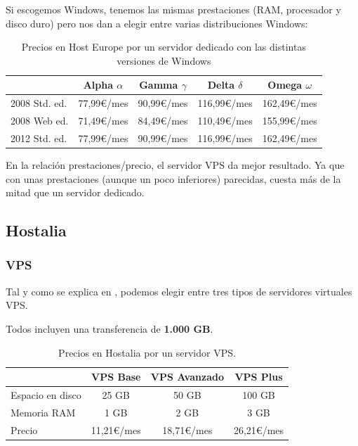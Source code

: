 \documentclass[10pt,a4paper,spanish]{article}
\numberwithin{equation}{section} %
\numberwithin{figure}{section} %
\numberwithin{table}{section} %
\begin{document}
Si escogemos Windows, tenemos las mismas prestaciones (RAM, procesador y disco duro) pero nos dan a elegir entre varias distribuciones Windows:

\begin{table}[!h]
\begin{tabular}{l | c | c | c | c}
 & Alpha $\alpha$ & Gamma $\gamma$ & Delta $\delta$ & Omega $\omega$ \\
\hline
2008 Std. ed. & 77,99\euro/mes & 90,99\euro/mes & 116,99\euro/mes & 162,49\euro/mes \\
2008 Web ed. & 71,49\euro/mes & 84,49\euro/mes & 110,49\euro/mes & 155,99\euro/mes \\
2012 Std. ed. & 77,99\euro/mes & 90,99\euro/mes & 116,99\euro/mes & 162,49\euro/mes \\
\end{tabular}
\caption{Precios en Host Europe por un servidor dedicado con las distintas versiones de Windows}
\label{hesewin}
\end{table}

En la relación prestaciones/precio, el servidor VPS da mejor resultado. Ya que con unas prestaciones (aunque un poco inferiores) parecidas, cuesta más de la mitad que un servidor dedicado. 

\subsection{Hostalia}
\subsubsection{VPS}
Tal y como se explica en \cite{hvps}, podemos elegir entre tres tipos de servidores virtuales VPS.

Todos incluyen una transferencia de \textbf{1.000 GB}.

\begin{table}[!h]
\begin{tabular}{l | c | c | c }
 & VPS Base & VPS Avanzado &  VPS Plus \\
 \hline
 Espacio en disco & 25 GB & 50 GB & 100 GB \\
 Memoria RAM & 1 GB & 2 GB & 3 GB \\
 Precio & 11,21\euro/mes & 18,71\euro/mes & 26,21\euro/mes \\
\end{tabular}
\caption{Precios en Hostalia por un servidor VPS.}
\label{hostvps}
\end{table}
\end{document}
